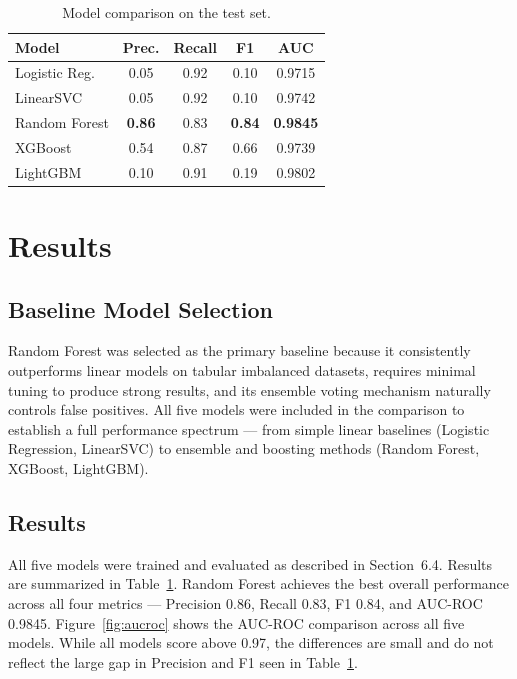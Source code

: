 \documentclass{article}
\begin{document}
\begin{table}[!ht]
\centering
\caption{Model comparison on the test set.}
\label{tab:results}
\vskip 0.1in
\begin{small}
\begin{tabular}{lcccc}
\toprule
Model & Prec. & Recall & F1 & AUC \\
\midrule
Logistic Reg.  & 0.05 & 0.92 & 0.10 & 0.9715 \\
LinearSVC      & 0.05 & 0.92 & 0.10 & 0.9742 \\
Random Forest  & \textbf{0.86} & 0.83 & \textbf{0.84} & \textbf{0.9845} \\
XGBoost        & 0.54 & 0.87 & 0.66 & 0.9739 \\
LightGBM       & 0.10 & 0.91 & 0.19 & 0.9802 \\
\bottomrule
\end{tabular}
\end{small}
\end{table}

\section{Results}

\subsection{Baseline Model Selection}

Random Forest was selected as the primary baseline because it
consistently outperforms linear models on tabular imbalanced datasets,
requires minimal tuning to produce strong results, and its ensemble
voting mechanism naturally controls false positives. All five models were
included in the comparison to establish a full performance spectrum ---
from simple linear baselines (Logistic Regression, LinearSVC) to
ensemble and boosting methods (Random Forest, XGBoost, LightGBM).

\subsection{Results}

All five models were trained and evaluated as described in Section~6.4.
Results are summarized in Table~\ref{tab:results}. Random Forest achieves
the best overall performance across all four metrics --- Precision 0.86,
Recall 0.83, F1 0.84, and AUC-ROC 0.9845. Figure~\ref{fig:aucroc} shows
the AUC-ROC comparison across all five models. While all models score
above 0.97, the differences are small and do not reflect the large gap
in Precision and F1 seen in Table~\ref{tab:results}.
\end{document}
